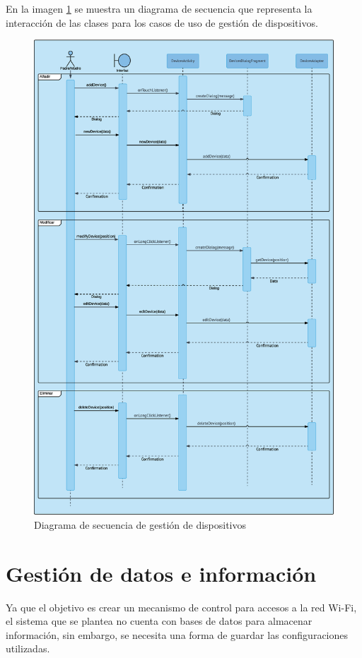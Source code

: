 \documentclass[12pt]{article}
\begin{document}
    En la imagen \ref{fig:device_management_sequence_diagram} se muestra un diagrama de secuencia que representa la interacción de las clases para los casos de uso de gestión de dispositivos.
    \begin{figure}[h!]
    \centering
        \includegraphics[scale=0.35]{device_management_sequence_diagram.eps}
        \caption{Diagrama de secuencia de gestión de dispositivos}
        \label{fig:device_management_sequence_diagram}
    \end{figure}

\section{Gestión de datos e información}
    Ya que el objetivo es crear un mecanismo de control para accesos a la red Wi-Fi, el sistema que se plantea no cuenta con bases de datos para almacenar información, sin embargo, se necesita una forma de guardar las configuraciones utilizadas.
    
\end{document}
